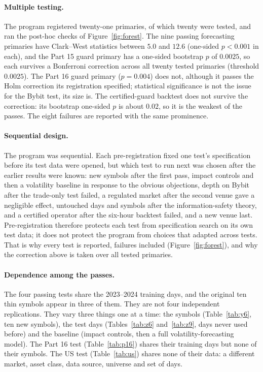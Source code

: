 \paragraph{Multiple testing.} The program registered twenty-one primaries, of which twenty were tested, and ran the post-hoc checks of Figure~\ref{fig:forest}. The nine passing forecasting primaries have Clark--West statistics between $5.0$ and $12.6$ (one-sided $p<0.001$ in each), and the Part 15 guard primary has a one-sided bootstrap $p$ of $0.0025$, so each survives a Bonferroni correction across all twenty tested primaries (threshold $0.0025$). The Part 16 guard primary ($p=0.004$) does not, although it passes the Holm correction its registration specified; statistical significance is not the issue for the Bybit test, its size is. The certified-guard backtest does not survive the correction: its bootstrap one-sided $p$ is about $0.02$, so it is the weakest of the passes. The eight failures are reported with the same prominence.

\paragraph{Sequential design.} The program was sequential. Each pre-registration fixed one test's specification before its test data were opened, but which test to run next was chosen after the earlier results were known: new symbols after the first pass, impact controls and then a volatility baseline in response to the obvious objections, depth on Bybit after the trade-only test failed, a regulated market after the second venue gave a negligible effect, untouched days and symbols after the information-safety theory, and a certified operator after the six-hour backtest failed, and a new venue last. Pre-registration therefore protects each test from specification search on its own test data; it does not protect the program from choices that adapted across tests. That is why every test is reported, failures included (Figure~\ref{fig:forest}), and why the correction above is taken over all tested primaries.

\paragraph{Dependence among the passes.} The four passing tests share the 2023--2024 training days, and the original ten thin symbols appear in three of them. They are not four independent replications. They vary three things one at a time: the symbols (Table~\ref{tab:y6}, ten new symbols), the test days (Tables~\ref{tab:z6} and~\ref{tab:z9}, days never used before) and the baseline (impact controls, then a full volatility-forecasting model). The Part 16 test (Table~\ref{tab:p16}) shares their training days but none of their symbols. The US test (Table~\ref{tab:us}) shares none of their data: a different market, asset class, data source, universe and set of days.

